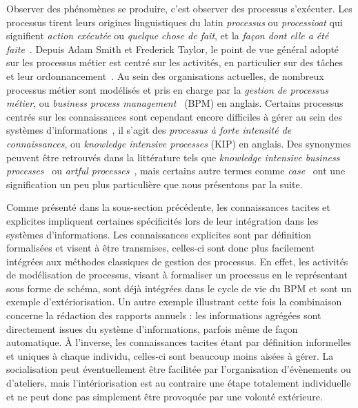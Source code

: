 Observer des phénomènes se produire, c'est observer des processus s'exécuter.
Les processus tirent leurs origines linguistiques du latin \textit{processus} ou \textit{processioat} qui signifient \textit{action exécutée} ou \textit{quelque chose de fait}, et la \textit{façon dont elle a été faite}~\cite{von2014complete}.
Depuis Adam Smith et Frederick Taylor, le point de vue général adopté sur les processus métier est centré sur les activités, en particulier sur des tâches et leur ordonnancement~\cite{boissier2019challenges}.
Au sein des organisations actuelles, de nombreux processus métier sont modélisés et pris en charge par la \textit{gestion de processus métier}, ou \textit{business process management}~\cite{weske2007business} (BPM) en anglais.
Certains processus centrés sur les connaissances sont cependant encore difficiles à gérer au sein des systèmes d'informations~\cite{boissier2019challenges}, il s'agit des \textit{processus à forte intensité de connaissances}, ou \textit{knowledge intensive processes} (KIP) en anglais.
Des synonymes peuvent être retrouvés dans la littérature tels que \textit{knowledge intensive business processes}~\cite{icsik2013practices}\cite{manfreda2015knowledge} ou \textit{artful processes}~\cite{hill2006beyond}, mais certains autre termes comme \textit{case}~\cite{davenport1994case}\cite{van2005case} ont une signification un peu plus particulière que nous présentons par la suite.

\bigskip

Comme présenté dans la sous-section précédente, les connaissances tacites et explicites impliquent certaines spécificités lors de leur intégration dans les systèmes d'informations.
Les connaissances explicites sont par définition formalisées et visent à être transmises, celles-ci sont donc plus facilement intégrées aux méthodes classiques de gestion des processus.
En effet, les activités de modélisation de processus, visant à formaliser un processus en le représentant sous forme de schéma, sont déjà intégrées dans le cycle de vie du BPM et sont un exemple d'extériorisation.
Un autre exemple illustrant cette fois la combinaison concerne la rédaction des rapports annuels : les informations agrégées sont directement issues du système d'informations, parfois même de façon automatique.
À l'inverse, les connaissances tacites étant par définition informelles et uniques à chaque individu, celles-ci sont beaucoup moins aisées à gérer.
La socialisation peut éventuellement être facilitée par l'organisation d'évènements ou d'ateliers, mais l'intériorisation est au contraire une étape totalement individuelle et ne peut donc pas simplement être provoquée par une volonté extérieure.

